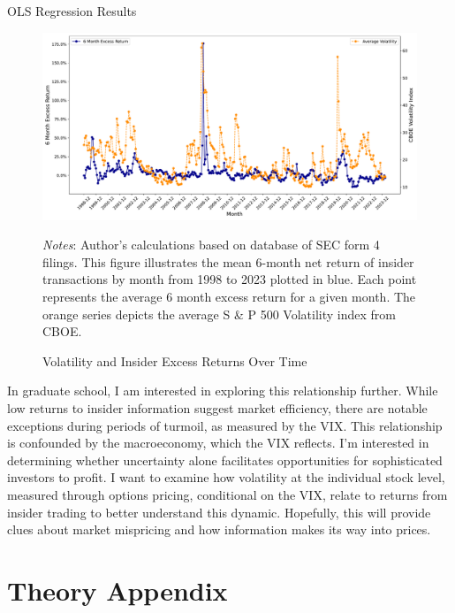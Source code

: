 \documentclass[12pt]{article}
\begin{document}
\begin{table}[H]
    \centering
    \caption{OLS Regression Results}
    \label{tab:regression_results}
    
\end{table}

\begin{figure}[H]
    \centering
    \caption{Volatility and Insider Excess Returns Over Time}
    \includegraphics[width=\textwidth]{insider_trades/figures/vol_returns.pdf}
\begin{spacing}{1}
{\parbox{.95\linewidth}{
		\scriptsize{\scriptsize{{\emph{Notes}: Author's calculations based on database of SEC form 4 filings. This figure illustrates the mean 6-month net return of insider transactions by month from 1998 to 2023 plotted in blue. Each point represents the average 6 month excess return for a given month. The orange series depicts the average S \& P 500 Volatility index from CBOE.}}}}}
\end{spacing}
    \label{fig:vol}
\end{figure}

In graduate school, I am interested in exploring this relationship further. While low returns to insider information suggest market efficiency, there are notable exceptions during periods of turmoil, as measured by the VIX. This relationship is confounded by the macroeconomy, which the VIX reflects. I'm interested in determining whether uncertainty alone facilitates opportunities for sophisticated investors to profit. I want to examine how volatility at the individual stock level, measured through options pricing, conditional on the VIX, relate to returns from insider trading to better understand this dynamic. Hopefully, this will provide clues about market mispricing and how information makes its way into prices.


\section{Theory Appendix} \label{sec:theory_appendix}
\end{document}
